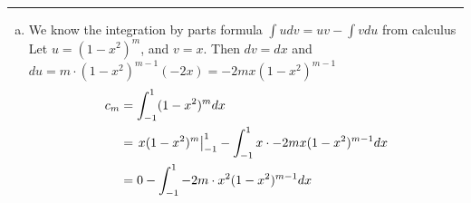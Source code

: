 \documentclass[11pt]{article}
\begin{document}
\hrule

\begin{enumerate}[(a)]

    \item We know the integration by parts formula $\int u dv = uv - \int v du$ from calculus
    Let $u = (1-x^2)^m$, and $v = x$. Then $dv = dx$ and $du = m \cdot (1 - x^2)^{m-1} (-2x) = -2mx(1 - x^2)^{m-1}$
    \begin{align*}
        c_m &= \int_{-1} ^1 (1-x^2)^m dx\\
        &= \left.x(1-x^2)^m\right\rvert_{-1}^{1} - \int_{-1} ^1 x \cdot -2mx(1 - x^2)^{m-1} dx \\
        &= 0 - \int_{-1} ^1 -2m \cdot x^2(1 - x^2)^{m-1} dx \\
    \end{align*}

\end{enumerate}
\end{document}
